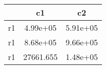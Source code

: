 \begin{table}[htbp]
\begin{tabular}{lcc} \hline \hline
 & c1  & c2  \\  \hline 
r1 &  4.99e+05 &  5.91e+05 \\  
r1 &  8.68e+05 &  9.66e+05 \\  
r1 & 27661.655 &  1.48e+05 \\  
\hline \hline \end{tabular}
\end{table}
